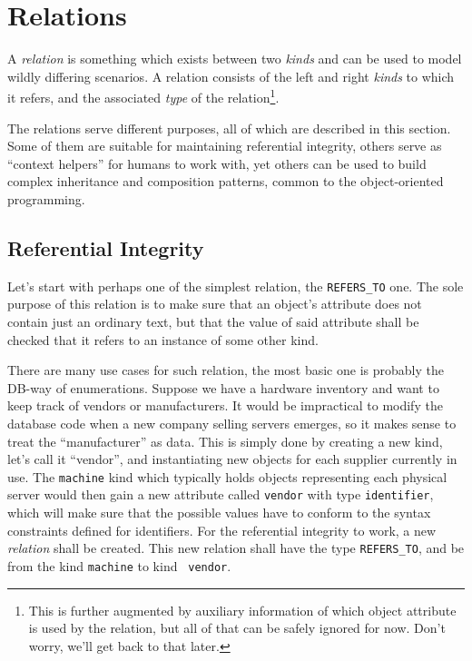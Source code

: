 \documentclass{article}
\begin{document}
\section{Relations}

A {\em relation} is something which exists between two {\em kinds} and can be used to model wildly differing scenarios.
A relation consists of the left and right {\em kinds} to which it refers, and the associated {\em type} of the
relation\footnote{This is further augmented by auxiliary information of which object attribute is used by the relation,
but all of that can be safely ignored for now.  Don't worry, we'll get back to that later.}.

The relations serve different purposes, all of which are described in this section.  Some of them are suitable for
maintaining referential integrity, others serve as ``context helpers'' for humans to work with, yet others can be used
to build complex inheritance and composition patterns, common to the object-oriented programming.

\subsection{Referential Integrity}

Let's start with perhaps one of the simplest relation, the {\tt REFERS\_TO} one.  The sole purpose of this relation is
to make sure that an object's attribute does not contain just an ordinary text, but that the value of said attribute
shall be checked that it refers to an instance of some other kind.

There are many use cases for such relation, the most basic one is probably the DB-way of enumerations.  Suppose we have
a hardware inventory and want to keep track of vendors or manufacturers.  It would be impractical to modify the database
code when a new company selling servers emerges, so it makes sense to treat the ``manufacturer'' as data.  This is
simply done by creating a new kind, let's call it ``vendor'', and instantiating new objects for each supplier currently
in use.  The {\tt machine} kind which typically holds objects representing each physical server would then gain a new
attribute called {\tt vendor} with type {\tt identifier}, which will make sure that the possible values have to conform
to the syntax constraints defined for identifiers.  For the referential integrity to work, a new {\em relation} shall be
created.  This new relation shall have the type {\tt REFERS\_TO}, and be from the kind {\tt machine} to kind {\tt
vendor}.
\end{document}
